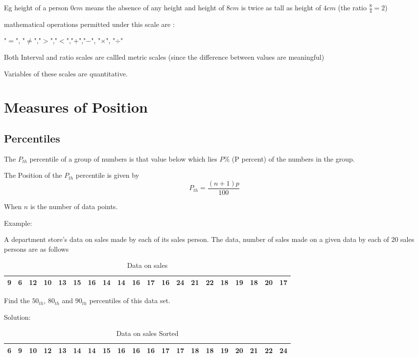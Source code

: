 \documentclass[12pt]{article}
\begin{document}
Eg height of a person $0cm$ means the absence of any height and height of $8cm$ is twice as tall as height of $4cm$ (the ratio $\frac{8}{4} = 2$)

mathematical operations permitted under this scale are :

"$=$", "$\neq$","$>$","$<$","$+$","$-$", "$\times$", "$\div$"

Both Interval and ratio scales are callled metric scales (since the difference between values are meaningful)

Variables of these scales are quantitative.


\section{Measures of Position}

\subsection{Percentiles}
The $P_{th}$ percentile of a group of numbers is that value below which lies $P\%$ (P percent) of the numbers in the group.

The Position of the $P_{th}$ percentile is given by
\begin{equation}
    P_{th} = \frac{(n+1)p}{100}
\end{equation}

When $n$ is the number of data points.

Example:

A department store's data on sales made by each  of its sales person. The data, number of sales made on a given data by each of $20$ sales persons are as follows
\begin{table}[H]
    \centering
    \caption{Data on sales}
    \begin{tabular}{|*{20}{c|}}

        \hline
        9  & 6  & 12 & 10 & 13 & 15 & 16 & 14 & 14 & 16 &
        17 & 16 & 24 & 21 & 22 & 18 & 19 & 18 & 20 & 17   \\
        \hline
    \end{tabular}
\end{table}


Find the $50_{th}$, $80_{th}$ and $90_{th}$ percentiles of this data set.

Solution:
\begin{table}[H]
    \centering
    \caption{Data on sales Sorted}
    \begin{tabular}{|*{20}{c|}}

        \hline
        6 & 9 & 10 & 12 & 13 & 14 & 14 & 15 & 16 & 16 & 16 & 17 & 17 & 18 & 18 & 19 & 20 & 21 & 22 & 24 \\
        \hline
    \end{tabular}
\end{table}
\end{document}
